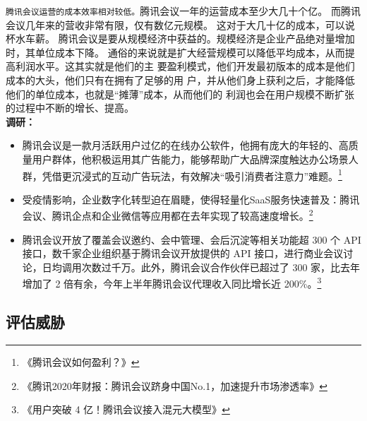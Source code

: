 \documentclass[a4paper,12pt]{article}
\begin{document}
\texttt{腾讯会议运营的成本效率相对较低。}腾讯会议一年的运营成本至少大几十个亿。 而腾讯会议几年来的营收非常有限，仅有数亿元规模。 这对于大几十亿的成本，可以说杯水车薪。
腾讯会议是要从规模经济中获益的。规模经济是企业产品绝对量增加时，其单位成本下降。
通俗的来说就是扩大经营规模可以降低平均成本，从而提高利润水平。这其实就是他们的主
要盈利模式，他们开发最初版本的成本是他们成本的大头，他们只有在拥有了足够的用
户，并从他们身上获利之后，才能降低他们的单位成本，也就是“摊薄”成本，从而他们的
利润也会在用户规模不断扩张的过程中不断的增长、提高。\\
\textbf{调研：}
\begin{itemize}
    \item 腾讯会议是一款月活跃用户过亿的在线办公软件，他拥有庞大的年轻的、高质量用户群体，他积极运用其广告能力，能够帮助广大品牌深度触达办公场景人群，凭借更沉浸式的互动广告玩法，有效解决“吸引消费者注意力”难题。\footnote{《腾讯会议如何盈利？》}
    \item 受疫情影响，企业数字化转型迫在眉睫，使得轻量化SaaS服务快速普及：腾讯会议、腾讯企点和企业微信等应用都在去年实现了较高速度增长。\footnote{《腾讯2020年财报：腾讯会议跻身中国No.1，加速提升市场渗透率》}
    \item 腾讯会议开放了覆盖会议邀约、会中管理、会后沉淀等相关功能超 300 个 API 接口，数千家企业组织基于腾讯会议开放提供的 API 接口，进行商业会议讨论，日均调用次数过千万。此外，腾讯会议合作伙伴已超过了 300 家，比去年增加了 2 倍有余，今年上半年腾讯会议代理收入同比增长近 200\%。\footnote{《用户突破 4 亿！腾讯会议接入混元大模型》}
\end{itemize}




    \subsection{评估威胁}\label{subsec:threat}
\end{document}
